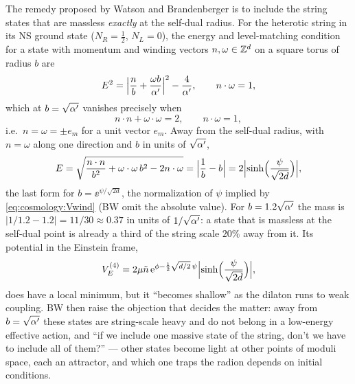 The remedy proposed by Watson and Brandenberger is to include the string states that are
massless \emph{exactly} at the self-dual radius. For the heterotic string in its NS ground
state ($N_R=\tfrac12$, $N_L=0$), the energy and level-matching condition for a state with
momentum and winding vectors $n,\omega\in\mathbb{Z}^d$ on a square torus of radius $b$ are
\begin{equation}\label{eq:cosmology:hetE}
 E^2=\Bigl|\frac{n}{b}+\frac{\omega b}{\alpha'}\Bigr|^2-\frac{4}{\alpha'},\qquad n\cdot\omega=1 ,
\end{equation}
which at $b=\sqrt{\alpha'}$ vanishes precisely when 
\begin{equation}\label{eq:cosmology:esp}
 n\cdot n+\omega\cdot\omega=2,\qquad n\cdot\omega=1 ,
\end{equation}
i.e.\ $n=\omega=\pm e_m$ for a unit vector $e_m$. Away from the self-dual radius, with
$n=\omega$ along one direction and $b$ in units of $\sqrt{\alpha'}$,
\begin{equation}\label{eq:cosmology:Eesp}
 E=\sqrt{\frac{n\cdot n}{b^2}+\omega\cdot\omega\,b^2-2n\cdot\omega}
 =\Bigl|\frac1b-b\Bigr|=2\Bigl|\sinh\Bigl(\frac{\psi}{\sqrt{2d}}\Bigr)\Bigr|,
\end{equation}
the last form for $b=\ee^{\psi/\sqrt{2d}}$, the normalization of $\psi$ implied by
\eqref{eq:cosmology:Vwind} (BW omit the absolute value). For $b=1.2\sqrt{\alpha'}$ the mass is
$|1/1.2-1.2|=11/30\approx0.37$
in units of $1/\sqrt{\alpha'}$: a state that is massless at the self-dual point is already a
third of the string scale $20\%$ away from it. Its potential in the Einstein frame,
\begin{equation}\label{eq:cosmology:Vesp}
 V_E^{(4)}=2\mu\tilde n\,\mathrm{e}^{\phi-\frac12\sqrt{d/2}\,\psi}\Bigl|\sinh\Bigl(\frac{\psi}{\sqrt{2d}}\Bigr)\Bigr|,
\end{equation}
does have a local minimum, but it ``becomes shallow'' as the dilaton runs to weak coupling.
 BW then raise the objection that decides the matter:
away from $b=\sqrt{\alpha'}$ these states are string-scale heavy and do not belong in a
low-energy effective action, and ``if we include one massive state of the string, don't we
have to include all of them?'' --- other states become light at other points of moduli
space, each an attractor, and which one traps the radion depends on initial conditions.

